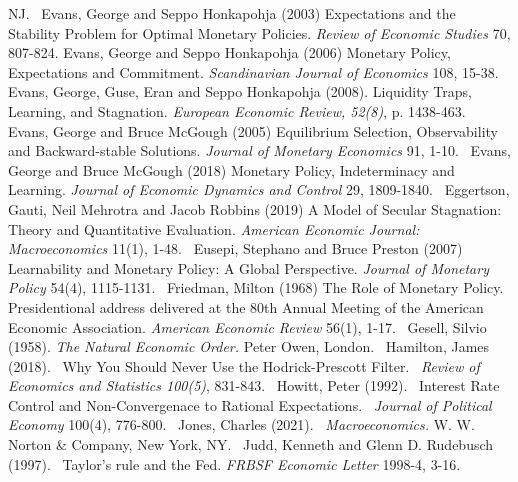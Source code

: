 \documentclass{article}
\begin{document}
\begin{doublespace}
NJ.\bigskip\ \newline
Evans, George and Seppo Honkapohja (2003) Expectations and the Stability
Problem for Optimal Monetary Policies. \textit{Review of Economic Studies}
70, 807-824.\bigskip \newline
Evans, George and Seppo Honkapohja (2006) Monetary Policy, Expectations and
Commitment. \textit{Scandinavian Journal of Economics} 108, 15-38.\bigskip 
\newline
Evans, George, Guse, Eran and Seppo Honkapohja (2008). Liquidity Traps,
Learning, and Stagnation. \textit{European Economic Review, 52(8)}, p.
1438-463.\bigskip\ \newline
Evans, George and Bruce McGough (2005) Equilibrium Selection, Observability
and Backward-stable Solutions. \textit{Journal of Monetary Economics} 91,
1-10.\bigskip\ \newline
Evans, George and Bruce McGough (2018) Monetary Policy, Indeterminacy and
Learning. \textit{Journal of Economic Dynamics and Control} 29,
1809-1840.\bigskip\ \newline
Eggertson, Gauti, Neil Mehrotra and Jacob Robbins (2019) A Model of Secular
Stagnation: Theory and Quantitative Evaluation. \textit{American Economic
Journal: Macroeconomics} 11(1), 1-48.\bigskip\ \newline
Eusepi, Stephano and Bruce Preston (2007) Learnability and Monetary Policy:
A Global Perspective. \textit{Journal of Monetary Policy} 54(4),
1115-1131.\bigskip\ \newline
Friedman, Milton (1968) The Role of Monetary Policy. Presidentional address
delivered at the 80th Annual Meeting of the American Economic Association. 
\textit{American Economic Review }56(1), 1-17.\bigskip\ \newline
Gesell, Silvio (1958). \textit{The Natural Economic Order.} Peter Owen,
London.\bigskip\ \newline
Hamilton, James (2018). \ Why You Should Never Use the Hodrick-Prescott
Filter. \ \textit{Review of Economics and Statistics 100(5)},
831-843.\bigskip\ \newline
Howitt, Peter (1992). \ Interest Rate Control and Non-Convergenace to
Rational Expectations. \ \textit{Journal of Political Economy} 100(4),
776-800.\bigskip\ \newline
Jones, Charles (2021). \ \textit{Macroeconomics.} W. W. Norton \& Company,
New York, NY.\bigskip\ \newline
Judd, Kenneth and Glenn D. Rudebusch (1997). \ Taylor's rule and the Fed. 
\textit{FRBSF Economic Letter} 1998-4, 3-16.\bigskip\ \newline

\end{doublespace}
\end{document}
